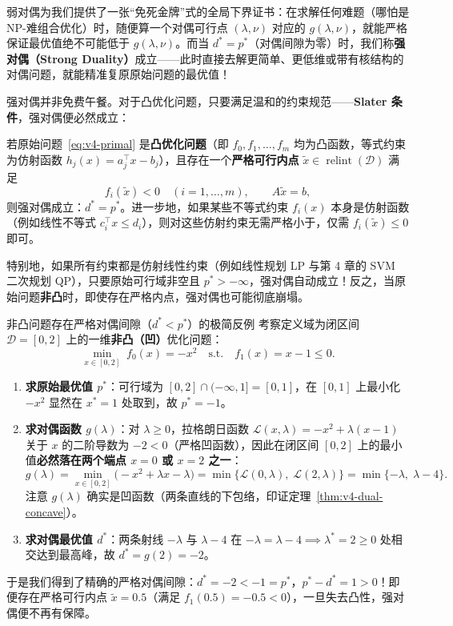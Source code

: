 弱对偶为我们提供了一张“免死金牌”式的全局下界证书：在求解任何难题（哪怕是 NP-难组合优化）时，随便算一个对偶可行点 $(\lambda, \nu)$ 对应的 $g(\lambda, \nu)$，就能严格保证最优值绝不可能低于 $g(\lambda, \nu)$。而当 $d^* = p^*$（对偶间隙为零）时，我们称\textbf{强对偶（Strong Duality）}成立——此时直接去解更简单、更低维或带有核结构的对偶问题，就能精准复原原始问题的最优值！

强对偶并非免费午餐。对于凸优化问题，只要满足温和的约束规范——\textbf{Slater 条件}，强对偶便必然成立：

\begin{thmBox}
\begin{theorem}\label{thm:v4-slater}
若原始问题~\eqref{eq:v4-primal} 是\textbf{凸优化问题}（即 $f_0, f_1, \dots, f_m$ 均为凸函数，等式约束为仿射函数 $h_j(x) = a_j^\top x - b_j$），且存在一个\textbf{严格可行内点} $\tilde{x} \in \operatorname{relint}(\mathcal{D})$ 满足
\[
  f_i(\tilde{x}) < 0 \quad (i = 1, \dots, m), \qquad A\tilde{x} = b,
\]
则强对偶成立：$d^* = p^*$。进一步地，如果某些不等式约束 $f_i(x)$ 本身是仿射函数（例如线性不等式 $c_i^\top x \le d_i$），则对这些仿射约束无需严格小于，仅需 $f_i(\tilde{x}) \le 0$ 即可。
\end{theorem}
\end{thmBox}

特别地，如果所有约束都是仿射线性约束（例如线性规划 LP 与第 4 章的 SVM 二次规划 QP），只要原始可行域非空且 $p^* > -\infty$，强对偶自动成立！反之，当原始问题\textbf{非凸}时，即使存在严格内点，强对偶也可能彻底崩塌。

\begin{failBox}{非凸问题存在严格对偶间隙（$d^* < p^*$）的极简反例}
考察定义域为闭区间 $\mathcal{D} = [0, 2]$ 上的一维\textbf{非凸（凹）}优化问题：
\[
  \min_{x \in [0, 2]}\; f_0(x) = -x^2 \quad\text{s.t.}\quad f_1(x) = x - 1 \le 0.
\]
\begin{enumerate}
  \item \textbf{求原始最优值 $p^*$}：可行域为 $[0, 2] \cap (-\infty, 1] = [0, 1]$，在 $[0, 1]$ 上最小化 $-x^2$ 显然在 $x^* = 1$ 处取到，故 $p^* = -1$。
  \item \textbf{求对偶函数 $g(\lambda)$}：对 $\lambda \ge 0$，拉格朗日函数 $\mathcal{L}(x, \lambda) = -x^2 + \lambda(x - 1)$ 关于 $x$ 的二阶导数为 $-2 < 0$（严格凹函数），因此在闭区间 $[0, 2]$ 上的最小值\textbf{必然落在两个端点 $x = 0$ 或 $x = 2$ 之一}：
  \[
    g(\lambda) = \min_{x \in [0, 2]} \big(-x^2 + \lambda x - \lambda\big)
    = \min\big\{\mathcal{L}(0, \lambda),\; \mathcal{L}(2, \lambda)\big\}
    = \min\{-\lambda,\; \lambda - 4\}.
  \]
  注意 $g(\lambda)$ 确实是凹函数（两条直线的下包络，印证定理~\ref{thm:v4-dual-concave}）。
  \item \textbf{求对偶最优值 $d^*$}：两条射线 $-\lambda$ 与 $\lambda - 4$ 在 $-\lambda = \lambda - 4 \implies \lambda^* = 2 \ge 0$ 处相交达到最高峰，故 $d^* = g(2) = -2$。
\end{enumerate}
于是我们得到了精确的严格对偶间隙：$d^* = -2 < -1 = p^*$，$p^* - d^* = 1 > 0$！即便存在严格可行内点 $\tilde{x} = 0.5$（满足 $f_1(0.5) = -0.5 < 0$），一旦失去凸性，强对偶便不再有保障。
\end{failBox}

